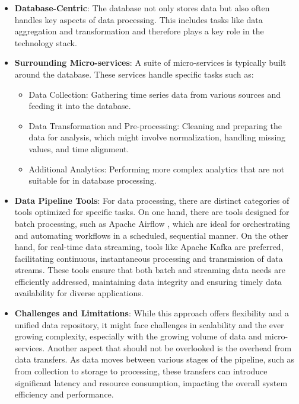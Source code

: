 \begin{itemize}
    \item \textbf{Database-Centric}: The database not only stores data but also often handles key aspects of data processing. This includes tasks like data aggregation and transformation and therefore plays a key role in the technology stack. 
    \item \textbf{Surrounding Micro-services}: A suite of micro-services is typically built around the database. These services handle specific tasks such as:
    \begin{itemize}
        \item Data Collection: Gathering time series data from various sources and feeding it into the database.
        \item Data Transformation and Pre-processing: Cleaning and preparing the data for analysis, which might involve normalization, handling missing values, and time alignment.
        \item Additional Analytics: Performing more complex analytics that are not suitable for in database processing.
    \end{itemize}

    \item \textbf{Data Pipeline Tools}: For data processing, there are distinct categories of tools optimized for specific tasks. On one hand, there are tools designed for batch processing, such as Apache Airflow \cite{apache_airflow}, which are ideal for orchestrating and automating workflows in a scheduled, sequential manner. On the other hand, for real-time data streaming, tools like Apache Kafka \cite{kafka_website} are preferred, facilitating continuous, instantaneous processing and transmission of data streams. These tools ensure that both batch and streaming data needs are efficiently addressed, maintaining data integrity and ensuring timely data availability for diverse applications.

    \item \textbf{Challenges and Limitations}: While this approach offers flexibility and a unified data repository, it might face challenges in scalability and the ever growing complexity, especially with the growing volume of data and micro-services. Another aspect that should not be overlooked is the overhead from data transfers. As data moves between various stages of the pipeline, such as from collection to storage to processing, these transfers can introduce significant latency and resource consumption, impacting the overall system efficiency and performance.

\end{itemize}

